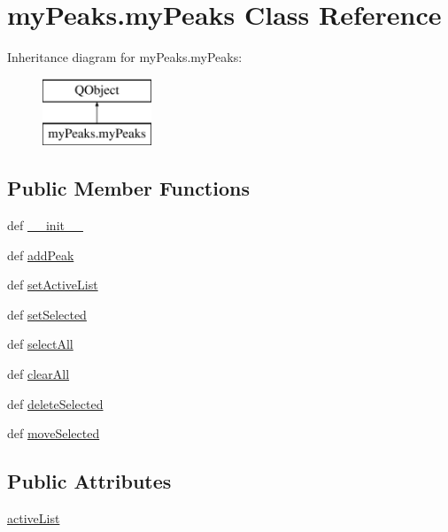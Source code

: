 \hypertarget{classmy_peaks_1_1my_peaks}{\section{my\-Peaks.\-my\-Peaks Class Reference}
\label{classmy_peaks_1_1my_peaks}
}
Inheritance diagram for my\-Peaks.\-my\-Peaks\-:\begin{figure}[H]
\begin{center}
\leavevmode
\includegraphics[height=2.000000cm]{classmy_peaks_1_1my_peaks}
\end{center}
\end{figure}
\subsection*{Public Member Functions}
\begin{DoxyCompactItemize}
\item 
def \hyperlink{classmy_peaks_1_1my_peaks_a96aa94100a2cae09e55aec9b21b5c934}{\-\_\-\-\_\-init\-\_\-\-\_\-}
\item 
def \hyperlink{classmy_peaks_1_1my_peaks_a85b8109b49ce283142c01c4f386657f5}{add\-Peak}
\item 
def \hyperlink{classmy_peaks_1_1my_peaks_a7f167f9ae163b0025f45f3552d238b4b}{set\-Active\-List}
\item 
def \hyperlink{classmy_peaks_1_1my_peaks_a8a2447225e6a87f1b0273697e633ba93}{set\-Selected}
\item 
def \hyperlink{classmy_peaks_1_1my_peaks_ab4288640f1dd2ea00b5aaa48d11014c4}{select\-All}
\item 
def \hyperlink{classmy_peaks_1_1my_peaks_aecd844074c5479e3379981ad71b85981}{clear\-All}
\item 
def \hyperlink{classmy_peaks_1_1my_peaks_a0da9e1901691583a56fb3784eedc91f7}{delete\-Selected}
\item 
def \hyperlink{classmy_peaks_1_1my_peaks_a90a5f3241c94520978668e1a3f62774e}{move\-Selected}
\end{DoxyCompactItemize}
\subsection*{Public Attributes}
\begin{DoxyCompactItemize}
\item 
\hyperlink{classmy_peaks_1_1my_peaks_ab764afe03c88786678b9b63fa09337ef}{active\-List}
\end{DoxyCompactItemize}
